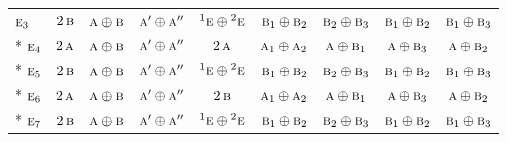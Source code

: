 \documentclass[10pt,a4paper]{article}
\numberwithin{equation}{section}
\newcommand{\irr}[1]{\text{\normalfont\scshape #1}}
\newcommand{\conjpair}[1]{{}^{#1}}
\begin{document}
{\begin{longtable}{@{}lcccccccc@{}}
$\irr{e}_{3}$ & $2\,\irr{b}$ & $\irr{a}\oplus \irr{b}$ & $\irr{a}'\oplus \irr{a}''$ & $\conjpair{1}\irr{e}\oplus \conjpair{2}\irr{e}$ & $\irr{b}_{1}\oplus \irr{b}_{2}$ & $\irr{b}_{2}\oplus \irr{b}_{3}$ & $\irr{b}_{1}\oplus \irr{b}_{2}$ & $\irr{b}_{1}\oplus \irr{b}_{3}$\\*
$\irr{e}_{4}$ & $2\,\irr{a}$ & $\irr{a}\oplus \irr{b}$ & $\irr{a}'\oplus \irr{a}''$ & $2\,\irr{a}$ & $\irr{a}_{1}\oplus \irr{a}_{2}$ & $\irr{a}\oplus \irr{b}_{1}$ & $\irr{a}\oplus \irr{b}_{3}$ & $\irr{a}\oplus \irr{b}_{2}$\\*
$\irr{e}_{5}$ & $2\,\irr{b}$ & $\irr{a}\oplus \irr{b}$ & $\irr{a}'\oplus \irr{a}''$ & $\conjpair{1}\irr{e}\oplus \conjpair{2}\irr{e}$ & $\irr{b}_{1}\oplus \irr{b}_{2}$ & $\irr{b}_{2}\oplus \irr{b}_{3}$ & $\irr{b}_{1}\oplus \irr{b}_{2}$ & $\irr{b}_{1}\oplus \irr{b}_{3}$\\*
$\irr{e}_{6}$ & $2\,\irr{a}$ & $\irr{a}\oplus \irr{b}$ & $\irr{a}'\oplus \irr{a}''$ & $2\,\irr{b}$ & $\irr{a}_{1}\oplus \irr{a}_{2}$ & $\irr{a}\oplus \irr{b}_{1}$ & $\irr{a}\oplus \irr{b}_{3}$ & $\irr{a}\oplus \irr{b}_{2}$\\*
$\irr{e}_{7}$ & $2\,\irr{b}$ & $\irr{a}\oplus \irr{b}$ & $\irr{a}'\oplus \irr{a}''$ & $\conjpair{1}\irr{e}\oplus \conjpair{2}\irr{e}$ & $\irr{b}_{1}\oplus \irr{b}_{2}$ & $\irr{b}_{2}\oplus \irr{b}_{3}$ & $\irr{b}_{1}\oplus \irr{b}_{2}$ & $\irr{b}_{1}\oplus \irr{b}_{3}$\\
\bottomrule\end{longtable}}
\end{document}
